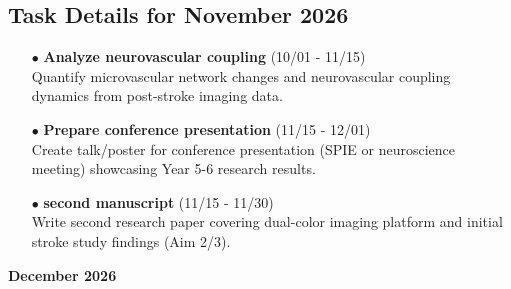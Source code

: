 \documentclass[landscape,a4paper]{article}
\begin{document}
\vspace{0.5cm}
\subsection{Task Details for November 2026}
\begin{itemize}[leftmargin=1cm]
    \item[\textcolor{other}{$\bullet$}] \textbf{Analyze neurovascular coupling} (10/01 - 11/15)\\ Quantify microvascular network changes and neurovascular coupling dynamics from post-stroke imaging data.
    \item[\textcolor{researchout}{$\bullet$}] \textbf{Prepare conference presentation} (11/15 - 12/01)\\ Create talk/poster for conference presentation (SPIE or neuroscience meeting) showcasing Year 5-6 research results.
    \item[\textcolor{researchout}{$\bullet$}] \textbf{second manuscript} (11/15 - 11/30)\\ Write second research paper covering dual-color imaging platform and initial stroke study findings (Aim 2/3).
\end{itemize}

\newpage
\pagestyle{empty}

\begin{center}
{\large\textbf{December 2026}}
\end{center}

\vspace{0.5cm}
\end{document}
